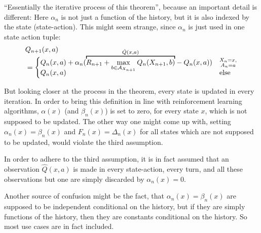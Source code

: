 ``Essentially the iterative process of this theorem'', because an important detail is different: Here \(\alpha_n\) is not just a function of the history, but it is also indexed by the state (state-action). This might seem strange, since \(\alpha_n\) is just used in one state action tuple:
\begin{align*}
    &Q_{n+1}(x,a)\\
    &= \begin{cases}
        Q_n(x,a)+\alpha_n (\smash{
            \overbracket[1pt]{
            R_{n+1}+\max_{b\in\cA_{X_{n+1}}}Q_n(X_{n+1},b)
            }^{
                \hat{Q}(x,a)
            }
        } 
        -Q_n(x,a)) & \substack{X_n=x,\\ A_n=a}\\
        Q_n(x,a) & \text{else}
    \end{cases}
\end{align*}

But looking closer at the process in the theorem, every state is updated in every iteration. In order to bring this definition in line with reinforcement learning algorithms, \(\alpha(x)\) (and \(\beta_n(x)\)) is set to zero, for every state \(x\), which is not supposed to be updated. The other way one might come up with, setting \(\alpha_n(x)=\beta_n(x)\) and \(F_n(x)=\Delta_n(x)\) for all states which are not supposed to be updated, would violate the third assumption. 

In order to adhere to the third assumption, it is in fact assumed that an observation \(\hat{Q}(x,a)\) is made in every state-action, every turn, and all these observations but one are simply discarded by \(\alpha_n(x)=0\).

Another source of confusion might be the fact, that \(\alpha_n(x)=\beta_n(x)\) are supposed to be independent conditional on the history, but if they are simply functions of the history, then they are constants conditional on the history. So most use cases are in fact included. 

